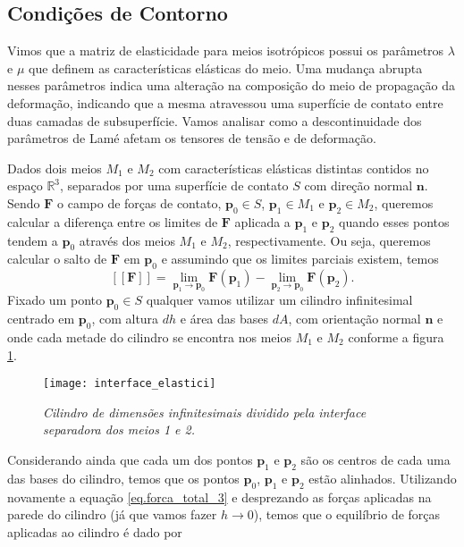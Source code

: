 \subsection{Condi\c{c}\~oes de Contorno}

Vimos que a matriz de elasticidade para meios isotr\'opicos possui os par\^ametros $\lambda$ e $\mu$ que definem as caracter\'isticas el\'asticas do meio. Uma mudan\c{c}a abrupta nesses par\^ametros indica uma altera\c{c}\~ao na composi\c{c}\~ao do meio de propaga\c{c}\~ao da deforma\c{c}\~ao, indicando que a mesma atravessou uma superf\'icie de contato entre duas camadas de subsuperf\'icie. Vamos analisar como a descontinuidade dos par\^ametros de Lam\'e afetam os tensores de tens\~ao e de deforma\c{c}\~ao.
 
Dados dois meios $M_1$ e $M_2$ com caracter\'isticas el\'asticas distintas contidos no espa\c{c}o $\mathbb{R}^3$, separados por uma superf\'icie de contato $S$ com dire\c{c}\~ao normal $\mathbf{n}$. Sendo $\mathbf{F}$ o campo de for\c{c}as de contato, $\mathbf{p}_0\in S$, $\mathbf{p}_1\in M_1$ e $\mathbf{p}_2\in M_2$, queremos calcular a diferen\c{c}a entre os limites de $\mathbf{F}$ aplicada a $\mathbf{p}_1$ e $\mathbf{p}_2$ quando esses pontos tendem a $\mathbf{p}_0$ atrav\'es dos meios $M_1$ e $M_2$, respectivamente. Ou seja, queremos calcular o salto de $\mathbf{F}$ em $\mathbf{p}_0$ e assumindo que os limites parciais existem, temos
\begin{equation*}
\left[\left[\mathbf{F}\right]\right]=\lim_{\mathbf{p}_1\to\mathbf{p}_0}\mathbf{F}(\mathbf{p}_1)-\lim_{\mathbf{p}_2\to\mathbf{p}_0}\mathbf{F}(\mathbf{p}_2).
\end{equation*}
Fixado um ponto $\mathbf{p}_0\in S$ qualquer vamos utilizar um cilindro infinitesimal centrado em $\mathbf{p}_0$, com altura $dh$ e \'area das bases $dA$, com orienta\c{c}\~ao normal $\mathbf{n}$ e onde cada metade do cilindro se encontra nos meios $M_1$ e $M_2$ conforme a figura \ref{fig.interface_elastici}. 
\begin{figure}[!htb]
\centering
\texttt{[image: interface\_elastici]}
\caption{\textit{Cilindro de dimens\~oes infinitesimais dividido pela interface separadora dos meios 1 e 2.}}
\label{fig.interface_elastici}
\end{figure}
Considerando ainda que cada um dos pontos $\mathbf{p}_1$ e $\mathbf{p}_2$ s\~ao os centros de cada uma das bases do cilindro, temos que os pontos $\mathbf{p}_0$, $\mathbf{p}_1$ e $\mathbf{p}_2$ est\~ao alinhados. Utilizando novamente a equa\c{c}\~ao \ref{eq.forca_total_3} e desprezando as for\c{c}as aplicadas na parede do cilindro (j\'a que vamos fazer $h\to 0$), temos que o equil\'ibrio de for\c{c}as aplicadas ao cilindro \'e dado por 
